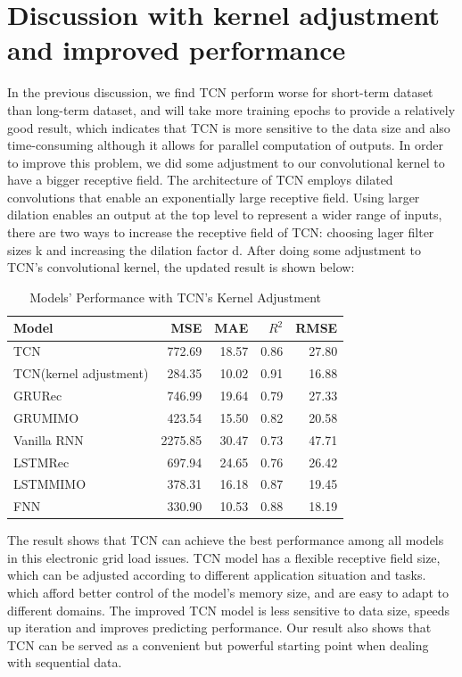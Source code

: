 \section{Discussion with kernel adjustment and improved performance}
In the previous discussion, we find TCN perform worse for short-term dataset than long-term dataset, and will take more training epochs to provide a relatively good result, which indicates that TCN is more sensitive to the data size and also time-consuming although it allows for parallel computation of outputs. In order to improve this problem, we did some adjustment to our convolutional kernel to have a bigger receptive field. The architecture of TCN employs dilated convolutions that enable an exponentially large receptive field. Using larger dilation enables an output at the top level to represent a wider range of inputs, there are two ways to increase the receptive field of TCN: choosing lager filter sizes k and increasing the dilation factor d. After doing some adjustment to TCN's convolutional kernel, the updated result is shown below:

\begin{table}[H]
\centering
\caption{Models' Performance with TCN's Kernel Adjustment}
\begin{tabular}{l r r r r}
\toprule
\textbf{Model} & \textbf{MSE} & \textbf{MAE} & \textbf{$R^2$}& \textbf{RMSE}\\
\midrule
TCN & 772.69& 18.57& 0.86& 27.80\\
TCN(kernel adjustment) & 284.35 & 10.02 & \color{red}0.91& 16.88\\
GRU\-Rec & 746.99& 19.64& 0.79& 27.33 \\
GRU\-MIMO& 423.54& 15.50& 0.82& 20.58 \\
Vanilla RNN& 2275.85& 30.47& 0.73& 47.71 \\
LSTM\-Rec & 697.94& 24.65& 0.76& 26.42 \\
LSTM\-MIMO & 378.31& 16.18& 0.87& 19.45 \\
FNN & 330.90& 10.53& 0.88& 18.19 \\
\bottomrule
\end{tabular}
\label{tab:kernal}
\end{table}

The result shows that TCN can achieve the best performance among all models in this electronic grid load issues. TCN model has a flexible receptive field size, which can be adjusted according to different application situation and tasks. which afford better control of the model’s memory size, and are easy to adapt to different domains. The improved TCN model is less sensitive to data size, speeds up iteration and improves predicting performance. Our result also shows that TCN can be served as a convenient but powerful starting point when dealing with sequential data. 

